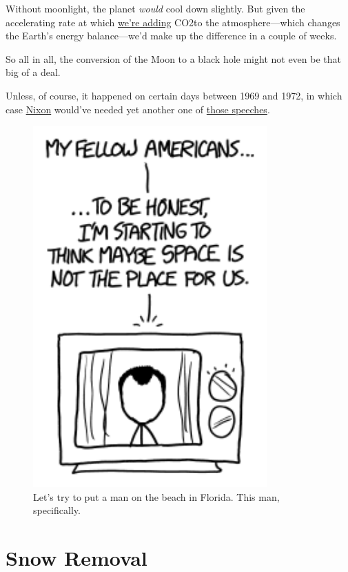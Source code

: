 {{Without moonlight, the planet \emph{would} cool down slightly. But given the accelerating rate at which \href{http://en.wikipedia.org/wiki/Keeling\_Curve}{we're adding} CO2to the atmosphere—which changes the Earth's energy balance—we'd make up the difference in a couple of weeks.}

{So all in all, the conversion of the Moon to a black hole might not even be that big of a deal.}

{Unless, of course, it happened on certain days between 1969 and 1972, in which case \href{http://www.archives.gov/presidential-libraries/events/centennials/nixon/images/exhibit/rn100-6-1-2.pdf}{Nixon} would've needed yet another one of \href{http://xkcd.com/1484/} {those speeches}.}

\begin{figure}[!htbp]
\centering
\includegraphics[scale=0.5, max width=0.8\textwidth]{imgs/a/129/nixon.png}
\caption{Let's try to put a man on the beach in Florida. This man, specifically.}
\end{figure}

{
\chapter{Snow Removal}
}

}
